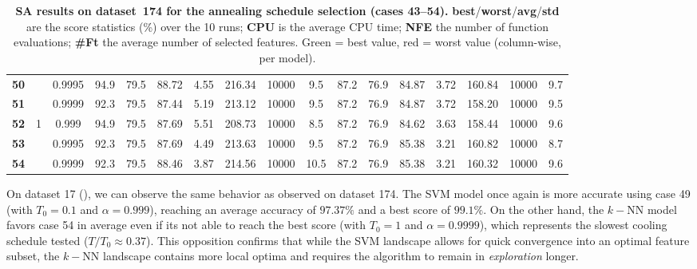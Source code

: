 \documentclass[12pt, openany]{article}
\begin{document}
\begin{table}[H]
{\begin{tabular}{|c|c|c|c c c c c c c|c c c c c c c|}
        \textbf{50} &  & 0.9995 & \cellcolor{best}94.9 & 79.5 & 88.72 & 4.55 & 216.34 & 10000 & 9.5 & 87.2 & 76.9 & 84.87 & 3.72 & 160.84 & 10000 & 9.7 \\
        
        \textbf{51} &  & 0.9999 & \cellcolor{worst}92.3 & 79.5 & \cellcolor{worst}87.44 & 5.19 & 213.12 & 10000 & 9.5 & 87.2 & 76.9 & 84.87 & 3.72 & 158.20 & 10000 & 9.5 \\
        \hdashline
        \textbf{52} & \multirow{3}{*}{1} & 0.999 & \cellcolor{best}94.9 & 79.5 & 87.69 & 5.51 & 208.73 & 10000 & 8.5 & 87.2 & 76.9 & 84.62 & 3.63 & 158.44 & 10000 & 9.6 \\
        
        \textbf{53} &  & 0.9995 & \cellcolor{worst}92.3 & 79.5 & 87.69 & 4.49 & 213.63 & 10000 & 9.5 & 87.2 & 76.9 & \cellcolor{best}85.38 & 3.21 & 160.82 & 10000 & 8.7 \\
        
        \textbf{54} &  & 0.9999 & \cellcolor{worst}92.3 & 79.5 & 88.46 & 3.87 & 214.56 & 10000 & 10.5 & 87.2 & 76.9 & \cellcolor{best}85.38 & 3.21 & 160.32 & 10000 & 9.6 \\
        \hline
    \end{tabular}
    }
    \caption{\textbf{SA results on dataset~174 for the annealing schedule selection (cases 43--54).} \textbf{best}/\textbf{worst}/\textbf{avg}/\textbf{std} are the score statistics (\%) over the 10 runs; \textbf{CPU} is the average CPU time; \textbf{NFE} the number of function evaluations; \textbf{\#Ft} the average number of selected features. Green = best value, red = worst value (column-wise, per model).}
    \label{tab:results_SA_schedule_d174}
\end{table}

On dataset 17 (), we can observe the same behavior as observed on dataset 174. The SVM model once again is more accurate using case 49 (with $T_0=0.1$ and $\alpha=0.999$), reaching an average accuracy of $97.37\%$ and a best score of $99.1\%$. On the other hand, the $k-$NN model favors case 54 in average even if its not able to reach the best score (with $T_0=1$ and $\alpha=0.9999$), which represents the slowest cooling schedule tested ($T/T_0 \approx 0.37$). This opposition confirms that while the SVM landscape allows for quick convergence into an optimal feature subset, the $k-$NN landscape contains more local optima and requires the algorithm to remain in \emph{exploration} longer.
\end{document}
